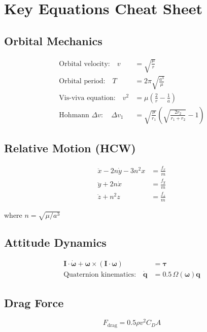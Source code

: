 \documentclass[11pt,a4paper]{article}
\begin{document}
\section{Key Equations Cheat Sheet}

\subsection{Orbital Mechanics}

\begin{align}
\text{Orbital velocity:} \quad v &= \sqrt{\frac{\mu}{r}} \\
\text{Orbital period:} \quad T &= 2\pi\sqrt{\frac{a^3}{\mu}} \\
\text{Vis-viva equation:} \quad v^2 &= \mu\left(\frac{2}{r} - \frac{1}{a}\right) \\
\text{Hohmann } \Delta v: \quad \Delta v_1 &= \sqrt{\frac{\mu}{r_1}}\left(\sqrt{\frac{2r_2}{r_1+r_2}} - 1\right)
\end{align}

\subsection{Relative Motion (HCW)}

\begin{align}
\ddot{x} - 2n\dot{y} - 3n^2x &= \frac{f_x}{m} \\
\ddot{y} + 2n\dot{x} &= \frac{f_y}{m} \\
\ddot{z} + n^2z &= \frac{f_z}{m}
\end{align}

where $n = \sqrt{\mu/a^3}$

\subsection{Attitude Dynamics}

\begin{align}
\mathbf{I} \cdot \dot{\boldsymbol{\omega}} + \boldsymbol{\omega} \times (\mathbf{I} \cdot \boldsymbol{\omega}) &= \boldsymbol{\tau} \\
\text{Quaternion kinematics:} \quad \dot{\mathbf{q}} &= 0.5 \, \Omega(\boldsymbol{\omega})\mathbf{q}
\end{align}

\subsection{Drag Force}

\begin{equation}
F_{\text{drag}} = 0.5 \rho v^2 C_D A
\end{equation}
\end{document}
